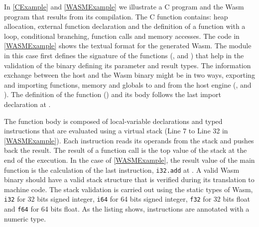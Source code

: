In \autoref{CExample} and \autoref{WASMExample} we illustrate a C program and the Wasm program that results from its compilation. The C function contains: heap allocation, external function declaration and the definition of a function with a loop, conditional branching, function calls and memory accesses. The code in \autoref{WASMExample} shows the textual format for the generated Wasm. The module in this case first defines the signature of the functions (,   and  )  that help in the validation of the binary defining its parameter and result types. The information exchange between the host and the Wasm  binary might be in two ways, exporting and importing functions, memory and globals to and from the host engine (,  and ). The definition of the function () and its body follows the last import declaration at . 

The function body is composed of local-variable declarations and typed instructions that are evaluated using a virtual stack (Line 7 to Line 32 in \autoref{WASMExample}). Each instruction reads its operands from the stack and pushes back the result. The result of a function call is the top value of the stack at the end of the execution. In the case of \autoref{WASMExample}, the result value of the main function is the calculation of the last instruction, \texttt{i32.add} at . A valid Wasm  binary should have a valid stack structure that is verified during its translation to machine code. The stack validation is carried out using the static types of Wasm, \texttt{i32} for 32 bits signed integer, \texttt{i64} for 64 bits signed integer, \texttt{f32} for 32 bits float and \texttt{f64} for 64 bits float. As the listing shows, instructions are annotated with a numeric type.

